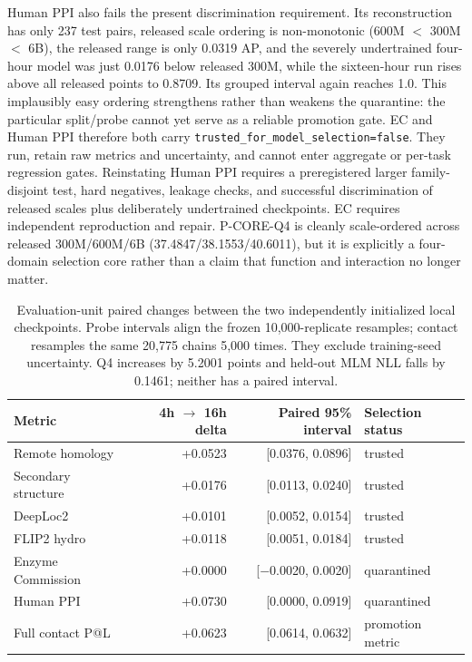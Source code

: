 \documentclass{article}
\newcommand{\code}[1]{\texttt{#1}}
\begin{document}
Human PPI also fails the present discrimination requirement. Its reconstruction
has only 237 test pairs, released scale ordering is non-monotonic
(600M $<$ 300M $<$ 6B), the released range is only 0.0319 AP, and the severely
undertrained four-hour model was just 0.0176 below released 300M, while the
sixteen-hour run rises above all released points to 0.8709. Its grouped
interval again reaches 1.0. This implausibly easy ordering strengthens rather
than weakens the quarantine: the particular split/probe cannot yet serve as a
reliable promotion gate. EC and Human PPI therefore both carry
\code{trusted\_for\_model\_selection=false}. They run, retain raw metrics and
uncertainty, and cannot enter aggregate or per-task regression gates.
Reinstating Human PPI requires a preregistered larger family-disjoint test,
hard negatives, leakage checks, and successful discrimination of released
scales plus deliberately undertrained checkpoints. EC requires independent
reproduction and repair. P-CORE-Q4 is cleanly scale-ordered across released
300M/600M/6B (37.4847/38.1553/40.6011), but it is explicitly a four-domain
selection core rather than a claim that function and interaction no longer
matter.

\begin{table}[H]
  \centering
  \scriptsize
  \setlength{\tabcolsep}{4pt}
  \begin{tabular}{@{}lrrl@{}}
    \toprule
    Metric & 4h $\rightarrow$ 16h delta & Paired 95\% interval & Selection status \\
    \midrule
    Remote homology & +0.0523 & [0.0376, 0.0896] & trusted \\
    Secondary structure & +0.0176 & [0.0113, 0.0240] & trusted \\
    DeepLoc2 & +0.0101 & [0.0052, 0.0154] & trusted \\
    FLIP2 hydro & +0.0118 & [0.0051, 0.0184] & trusted \\
    Enzyme Commission & +0.0000 & [$-$0.0020, 0.0020] & quarantined \\
    Human PPI & +0.0730 & [0.0000, 0.0919] & quarantined \\
    Full contact P@L & +0.0623 & [0.0614, 0.0632] & promotion metric \\
    \bottomrule
  \end{tabular}
  \caption{Evaluation-unit paired changes between the two independently initialized local checkpoints. Probe intervals align the frozen 10,000-replicate resamples; contact resamples the same 20,775 chains 5,000 times. They exclude training-seed uncertainty. Q4 increases by 5.2001 points and held-out MLM NLL falls by 0.1461; neither has a paired interval.}
  \label{tab:local-paired}
\end{table}
\end{document}
